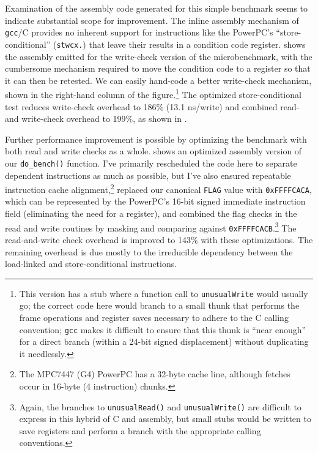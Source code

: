 Examination of the assembly code generated for this simple benchmark
seems to indicate substantial scope for improvement.  The inline
assembly mechanism of \texttt{gcc}/C provides no inherent support for
instructions 
like the PowerPC's ``store-conditional'' (\texttt{stwcx.}) that leave
their results in a condition code register.  
shows the assembly emitted for the write-check version of the
microbenchmark, with the cumbersome mechanism required to move the
condition code to a register so that it can then be retested.  We can
easily hand-code a better write-check mechanism, shown in the
right-hand column of the figure.\footnote{This version has a stub where a
function call to \texttt{unusualWrite} would usually go; the correct
code here would branch to a small thunk that performs the
frame operations and register saves necessary to adhere to the C
calling convention; \texttt{gcc} makes it difficult to ensure that
this thunk is ``near enough'' for a direct branch (within a 24-bit
signed displacement) without duplicating it needlessly.}
The optimized store-conditional test reduces write-check overhead to
186\% (13.1 ns/write) and combined read- and write-check overhead to
199\%, as shown in .

Further performance improvement is possible by optimizing the
benchmark with both read and write checks as a whole. 
shows an
optimized assembly version of our \texttt{do\_bench()} function.  I've
primarily rescheduled the code here to separate dependent instructions
as much as possible, but I've also ensured repeatable instruction
cache alignment,\footnote{The MPC7447 (G4) PowerPC has a 32-byte cache
  line, although fetches occur in 16-byte (4 instruction) chunks.}
replaced our canonical \texttt{FLAG} value with
\texttt{0xFFFFCACA}, which can be represented by the PowerPC's 16-bit
signed immediate instruction field (eliminating the need for a
register), and combined the flag checks in
the read and write routines by masking and comparing against
\texttt{0xFFFFCACB}.\footnote{Again, the branches to
\texttt{unusualRead()} and 
\texttt{unusualWrite()} are difficult to express in this hybrid of C
and assembly, but small stubs would be written to save registers and
perform a branch with the appropriate calling conventions.}
The read-and-write check overhead is improved to 143\% with these
optimizations.  The remaining overhead is
due mostly to the irreducible dependency between the
load-linked and store-conditional instructions.

